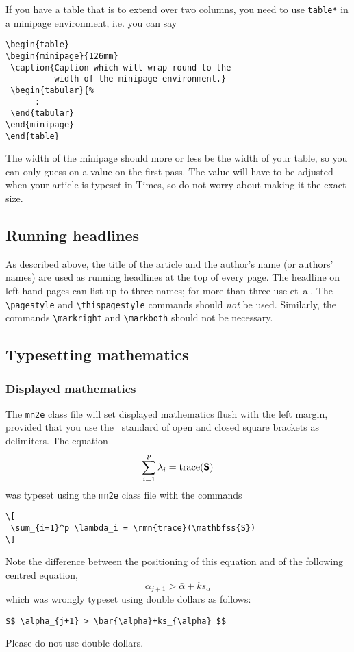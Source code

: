 \documentclass[useAMS,usenatbib]{mn2e}
\begin{document}
%
If you have a table that is to extend over two columns, you need
to use \verb"table*" in a minipage environment, i.e. you can say
%
\begin{verbatim}
\begin{table*}
\begin{minipage}{126mm}
 \caption{Caption which will wrap round to the
          width of the minipage environment.}
 \begin{tabular}{%
      :
 \end{tabular}
\end{minipage}
\end{table*}
\end{verbatim}
%
The width of the minipage should more or less be the width of your
table, so you can only guess on a value on the first pass. The
value will have to be adjusted when your article is typeset in
Times, so do not worry about making it the exact size.

\subsection{Running headlines}

As described above, the title of the article and the author's name (or
authors' names) are used as running headlines at the top of every page.
The headline on left-hand pages can list up to three names; for more than
three use et~al. The \verb"\pagestyle" and \verb"\thispagestyle"
commands should {\em not\/} be used. Similarly, the commands
\verb"\markright" and \verb"\markboth" should not be necessary.


\subsection[]{Typesetting mathematics}\label{TMth}

\subsubsection{Displayed mathematics}

The {\tt mn2e} class file will set displayed mathematics flush with the
left margin, provided that you use the \LaTeXe\ standard of open and closed
square brackets as delimiters. The equation
\[
 \sum_{i=1}^p \lambda_i = {\mathrm{trace}}(\textbf{\textsf{S}})
\]
was typeset using the {\tt mn2e} class file with the commands
%
\begin{verbatim}
\[
 \sum_{i=1}^p \lambda_i = \rmn{trace}(\mathbfss{S})
\]
\end{verbatim}
%
Note the difference between the positioning of this equation and of
the following centred equation,
$$ \alpha_{j+1} > \bar{\alpha}+ks_{\alpha} $$
which was wrongly typeset using double dollars as follows:
%
\begin{verbatim}
$$ \alpha_{j+1} > \bar{\alpha}+ks_{\alpha} $$
\end{verbatim}
Please do not use double dollars.
\end{document}
